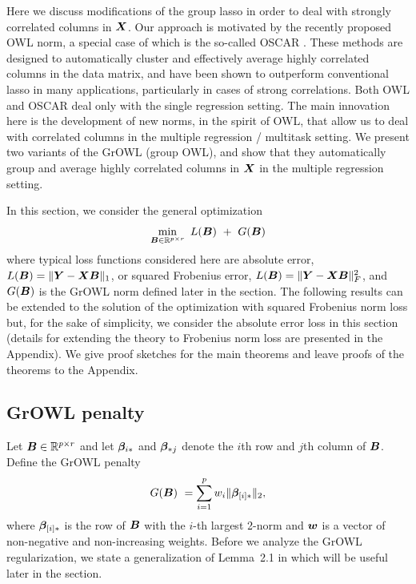 Here we discuss modifications of the group lasso in order to deal with strongly correlated columns in $\boldsymbol{X}$.  Our approach is motivated by the recently proposed OWL \cite{owl} norm, a special case of which is the so-called OSCAR \cite{oscar}.  These methods are designed to automatically cluster and effectively average highly correlated columns in the data matrix, and have been shown to outperform conventional lasso in many applications, particularly in cases of strong correlations. Both OWL and OSCAR deal only with the single regression setting. The main innovation here is the development of new norms, in the spirit of OWL, that allow us to deal with correlated columns in the multiple regression / multitask setting. We present two variants of the GrOWL (group OWL), and show that they  automatically group and average highly correlated columns in $\boldsymbol{X}$ in the multiple regression setting. 

In this section, we consider the general optimization
\begin{equation}\label{eqn:L1}
\min_{\bB \in \R^{p \times r}} \ L(\bB) \ + \ G(\bB)   
\end{equation}
 where typical loss functions considered here are absolute error, $L(\boldsymbol{B}) = \|\boldsymbol{Y} - \boldsymbol{X} \boldsymbol{B} \|_1$, or squared Frobenius error, $L(\boldsymbol{B}) = \|\boldsymbol{Y} - \boldsymbol{X} \boldsymbol{B} \|_F^2$, and $G(\boldsymbol{B})$ is the GrOWL norm defined later in the section. The following results can be extended to the solution of the optimization with squared Frobenius norm loss but, for the sake of simplicity, we consider the absolute error loss in this section (details for extending the theory to Frobenius norm loss are presented in the Appendix). We give proof sketches for the main theorems and leave proofs of the theorems to the Appendix.  

\subsection{GrOWL penalty}
Let $\boldsymbol{B} \in {\mathbb R}^{p\times r}$ and let $\boldsymbol{\beta}_{i {\ast}}$ and $\boldsymbol{\beta}_{{\ast}  j}$ denote the $i$th row and $j$th column of $\boldsymbol{B}$.  Define the GrOWL penalty
\begin{equation}\label{Eqn:growl}
G(\bB) \ =  \sum_{i=1}^p w_i \|\bbeta_{[i]\a}\|_2 , 
\end{equation}
where $\boldsymbol{\beta}_{[i]{\ast}}$ is the row of $\boldsymbol{B}$ with the $i$-th largest 2-norm and $\boldsymbol{w}$ is a vector of non-negative and non-increasing weights.
Before we analyze the GrOWL regularization, we state a generalization of Lemma~2.1 in \cite{owl} which will be useful later in the section. 

